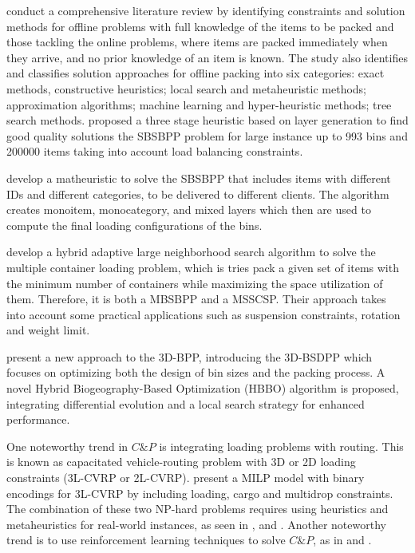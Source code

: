 \autocite{Ali2022On-lineApproaches} conduct a comprehensive literature review by identifying constraints and solution methods for offline problems with full knowledge of the items to be packed and those tackling the online problems, where items are packed immediately when they arrive, and no prior knowledge of an item is known. The study also identifies and classifies solution approaches for offline packing into six categories: exact methods, constructive heuristics; local search and metaheuristic methods; approximation algorithms; machine learning and hyper-heuristic methods; tree search methods.
\autocite{Harrath2022} proposed a three stage heuristic based on layer generation to find good quality solutions  the SBSBPP problem for large instance up to 993 bins and 200000 items taking into account load balancing constraints.


\autocite{Tresca2022} develop a matheuristic to solve the SBSBPP that includes items with different IDs and different categories, to be delivered to different clients. The algorithm creates monoitem, monocategory, and mixed layers which then are used to compute the final loading configurations of the bins.

\autocite{Li2022} develop a hybrid adaptive large neighborhood search algorithm to solve the multiple container loading problem, which is tries pack a given set of items with the minimum number of containers while maximizing the space utilization of them. Therefore, it is both a MBSBPP and a MSSCSP. Their approach takes into account some practical applications such as suspension constraints, rotation and weight limit.

\autocite{Chen2023}  present a new approach to the 3D-BPP, introducing the 3D-BSDPP which focuses on optimizing both the design of bin sizes and the packing process. A novel Hybrid Biogeography-Based Optimization (HBBO) algorithm is proposed, integrating differential evolution and a local search strategy for enhanced performance.



One noteworthy trend in $C\&P$ is integrating loading problems with routing. This is known as capacitated vehicle-routing problem with 3D or 2D loading constraints (3L-CVRP or 2L-CVRP). \autocite{Junqueira2012Three-dimensionalConstraints} present a MILP model with binary encodings for 3L-CVRP by including loading, cargo and multidrop constraints. The combination of these two NP-hard problems requires using heuristics and metaheuristics for real-world instances, as seen in \autocite{Dominguez2016UsingFleet}, \autocite{Alonso2022TheRevision} and \autocite{Wei2015AConstraints}. Another noteworthy trend is to use reinforcement learning techniques to solve $C\&P$, as in \autocite{Que2023SolvingLearning} and \autocite{Zhao2022LearningPacking}.


